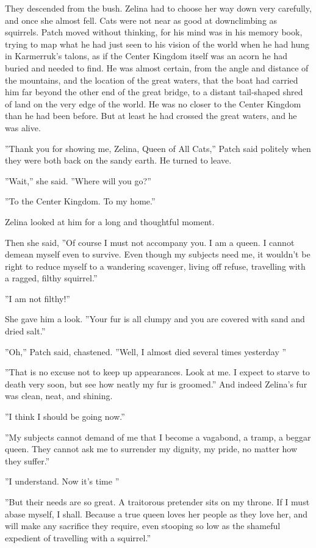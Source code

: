 \documentclass[12pt]{book}
\begin{document}
 They descended from the bush. Zelina had to choose her way down very carefully, and once she almost fell. Cats were not near as good at downclimbing as squirrels. Patch moved without thinking, for his mind was in his memory book, trying to map what he had just seen to his vision of the world when he had hung in Karmerruk's talons, as if the Center Kingdom itself was an acorn he had buried and needed to find. He was almost certain, from the angle and distance of the mountains, and the location of the great waters, that the boat had carried him far beyond the other end of the great bridge, to a distant tail-shaped shred of land on the very edge of the world. He was no closer to the Center Kingdom than he had been before. But at least he had crossed the great waters, and he was alive.\par
 ''Thank you for showing me, Zelina, Queen of All Cats,'' Patch said politely when they were both back on the sandy earth. He turned to leave.\par
 ''Wait,'' she said. ''Where will you go?''\par
 ''To the Center Kingdom. To my home.''\par
 Zelina looked at him for a long and thoughtful moment.\par
Then she said, ''Of course I must not accompany you. I am a queen. I cannot demean myself even to survive. Even though my subjects need me, it wouldn't be right to reduce myself to a wandering scavenger, living off refuse, travelling with a ragged, filthy squirrel.''\par
 ''I am not filthy!''\par
 She gave him a look. ''Your fur is all clumpy and you are covered with sand and dried salt.''\par
 ''Oh,'' Patch said, chastened. ''Well, I almost died several times yesterday %
''\par
 ''That is no excuse not to keep up appearances. Look at me. I expect to starve to death very soon, but see how neatly my fur is groomed.'' And indeed Zelina's fur was clean, neat, and shining.\par
 ''I think I should be going now.''\par
 ''My subjects cannot demand of me that I become a vagabond, a tramp, a beggar queen. They cannot ask me to surrender my dignity, my pride, no matter how they suffer.''\par
''I understand. Now it's time %
''\par
''But their needs are so great. A traitorous pretender sits on my throne. If I must abase myself, I shall. Because a true queen loves her people as they love her, and will make any sacrifice they require, even stooping so low as the shameful expedient of travelling with a squirrel.''\par
\end{document}
